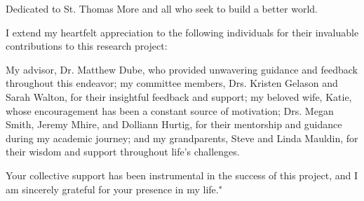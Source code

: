 \begin{dedication}
Dedicated to St. Thomas More and all who seek to build a better world.
\end{dedication}

\begin{acknowledgements}
I extend my heartfelt appreciation to the following individuals for their invaluable contributions to this research project:
    
    My advisor, Dr. Matthew Dube, who provided unwavering guidance and feedback throughout this endeavor; my committee members, Drs. Kristen Gelason and Sarah Walton, for their insightful feedback and support; my beloved wife, Katie, whose encouragement has been a constant source of motivation; Drs. Megan Smith, Jeremy Mhire, and Dolliann Hurtig, for their mentorship and guidance during my academic journey; and my grandparents, Steve and Linda Mauldin, for their wisdom and support throughout life's challenges.
    
    Your collective support has been instrumental in the success of this project, and I am sincerely grateful for your presence in my life."
\end{acknowledgements}

\pagebreak

\tableofcontents

\pagebreak

\listoftables	

\pagebreak
\listoffigures		
\pagebreak		%



\mainmatter

\endinput
